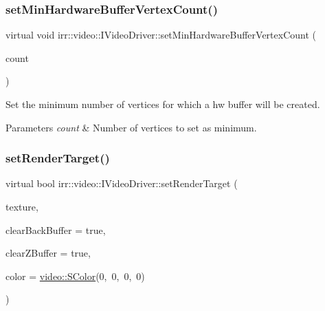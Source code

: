 \subsubsection{\texorpdfstring{set\+Min\+Hardware\+Buffer\+Vertex\+Count()}{setMinHardwareBufferVertexCount()}\hspace{0.1cm}{\footnotesize\ttfamily [2/2]}}
{\footnotesize\ttfamily virtual void irr\+::video\+::\+I\+Video\+Driver\+::set\+Min\+Hardware\+Buffer\+Vertex\+Count (\begin{DoxyParamCaption}\item[{\hyperlink{namespaceirr_a0416a53257075833e7002efd0a18e804}{u32}}]{count }\end{DoxyParamCaption})\hspace{0.3cm}{\ttfamily [pure virtual]}}



Set the minimum number of vertices for which a hw buffer will be created. 


\begin{DoxyParams}{Parameters}
{\em count} & Number of vertices to set as minimum. \\
\hline
\end{DoxyParams}
\mbox{\label{classirr_1_1video_1_1IVideoDriver_a8c38a8d8d6d49be53bda55eb0749e7eb}} 
\subsubsection{\texorpdfstring{set\+Render\+Target()}{setRenderTarget()}\hspace{0.1cm}{\footnotesize\ttfamily [1/4]}}
{\footnotesize\ttfamily virtual bool irr\+::video\+::\+I\+Video\+Driver\+::set\+Render\+Target (\begin{DoxyParamCaption}\item[{\hyperlink{classirr_1_1video_1_1ITexture}{video\+::\+I\+Texture} $\ast$}]{texture,  }\item[{bool}]{clear\+Back\+Buffer = {\ttfamily true},  }\item[{bool}]{clear\+Z\+Buffer = {\ttfamily true},  }\item[{\hyperlink{classirr_1_1video_1_1SColor}{S\+Color}}]{color = {\ttfamily \hyperlink{classirr_1_1video_1_1SColor}{video\+::\+S\+Color}(0,~0,~0,~0)} }\end{DoxyParamCaption})\hspace{0.3cm}{\ttfamily [pure virtual]}}



